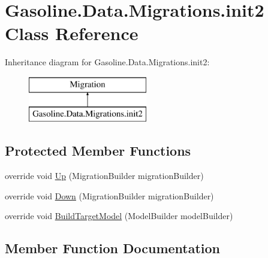\hypertarget{class_gasoline_1_1_data_1_1_migrations_1_1init2}{}\section{Gasoline.\+Data.\+Migrations.\+init2 Class Reference}
\label{class_gasoline_1_1_data_1_1_migrations_1_1init2}
Inheritance diagram for Gasoline.\+Data.\+Migrations.\+init2\+:\begin{figure}[H]
\begin{center}
\leavevmode
\includegraphics[height=2.000000cm]{class_gasoline_1_1_data_1_1_migrations_1_1init2}
\end{center}
\end{figure}
\subsection*{Protected Member Functions}
\begin{DoxyCompactItemize}
\item 
override void \mbox{\hyperlink{class_gasoline_1_1_data_1_1_migrations_1_1init2_a34ad66548e8e251cc6cd5c8be2a7c3c7}{Up}} (Migration\+Builder migration\+Builder)
\item 
override void \mbox{\hyperlink{class_gasoline_1_1_data_1_1_migrations_1_1init2_a6c61ee50816e7bf803a0212f378c51d3}{Down}} (Migration\+Builder migration\+Builder)
\item 
override void \mbox{\hyperlink{class_gasoline_1_1_data_1_1_migrations_1_1init2_a39793885cf7b46e24f4d594096e81553}{Build\+Target\+Model}} (Model\+Builder model\+Builder)
\end{DoxyCompactItemize}


\subsection{Member Function Documentation}
\mbox{\label{class_gasoline_1_1_data_1_1_migrations_1_1init2_a39793885cf7b46e24f4d594096e81553}} 
